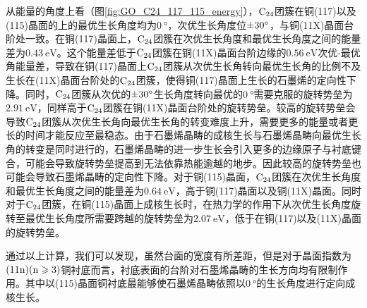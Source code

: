 从能量的角度上看（图\ref{fig:GO_C24_117_115_energy}），$\rm{C_{24}}$团簇在铜(117)以及(115)晶面的上的最优生长角度均为$\SI{0 }{\degree}$，次优生长角度位$\SI{\pm 30 }{\degree}$，与铜(11X)晶面台阶处一致。在铜(117)晶面上，$\rm{C_{24}}$团簇在次优生长角度和最优生长角度之间的能量差为$\SI{0.43}{\electronvolt}$。这个能量差低于$\rm{C_{24}}$团簇在铜(11X)晶面台阶边缘的$\SI{0.56}{\electronvolt}$次优-最优角能量差，导致在铜(117)晶面上$\rm{C_{24}}$团簇从次优生长角转向最优生长角的比例不及生长在(11X)晶面台阶处的$\rm{C_{24}}$团簇，使得铜(117)晶面上生长的石墨烯的定向性下降。同时，$\rm{C_{24}}$团簇从次优的$\SI{\pm 30 }{\degree}$生长角度转向最优的$\SI{0}{\degree}$需要克服的旋转势垒为$\SI{2.91 }{\electronvolt}$，同样高于$\rm{C_{24}}$团簇在铜(11X)晶面台阶处的旋转势垒。较高的旋转势垒会导致$\rm{C_{24}}$团簇从次优生长角向最优生长角的转变难度上升，需要更多的能量或者更长的时间才能反应至最稳态。由于石墨烯晶畴的成核生长与石墨烯晶畴向最优生长角的转变是同时进行的，石墨烯晶畴的进一步生长会引入更多的边缘原子与衬底键合，可能会导致旋转势垒提高到无法依靠热能逾越的地步。因此较高的旋转势垒也可能会导致石墨烯晶畴的定向性下降。对于铜(115)晶面，$\rm{C_{24}}$团簇在次优生长角度和最优生长角度之间的能量差为$\SI{0.64}{\electronvolt}$，高于铜(117)晶面以及铜(11X)晶面。同时对于$\rm{C_{24}}$团簇，在铜(115)晶面上成核生长时，在热力学的作用下从次优生长角度旋转至最优生长角度所需要跨越的旋转势垒为$\SI{2.07 }{\electronvolt}$，低于在铜(117)以及(11X)晶面的旋转势垒。

通过以上计算，我们可以发现，虽然台面的宽度有所差距，但是对于晶面指数为$\rm{(11n)(n \geqslant 3)}$铜衬底而言，衬底表面的台阶对石墨烯晶畴的生长方向均有限制作用。其中以(115)晶面铜衬底最能够使石墨烯晶畴依照以$\SI{0 }{\degree}$的生长角度进行定向成核生长。

